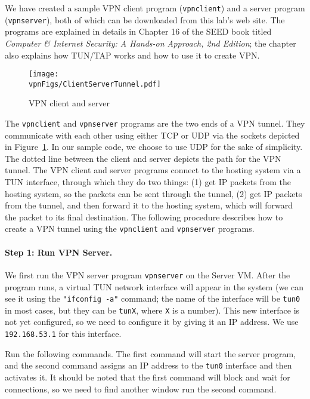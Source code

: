 We have created a sample VPN client program (\texttt{vpnclient})  and 
a server program (\texttt{vpnserver}), both of which can be downloaded from
this lab's web site. 
The programs are explained in details in Chapter 16 of the SEED book titled
\textit{Computer \& Internet Security: A Hands-on Approach, 2nd Edition}; the chapter also
explains how TUN/TAP works and how to use it to create VPN.



\begin{figure}[htb]
\begin{center}
\texttt{[image: \\vpnFigs/ClientServerTunnel.pdf]}
\end{center}
\caption{VPN client and server}
\label{vpn:fig:client_server}
\end{figure}

The \texttt{vpnclient} and \texttt{vpnserver} programs are the two ends of
a VPN tunnel. They communicate with each other using either TCP or UDP via the sockets
depicted in Figure~\ref{vpn:fig:client_server}. In our sample code, we choose 
to use UDP for the sake of simplicity.  The dotted line between the
client and server depicts the path for the VPN tunnel. 
The VPN client and server programs connect to the hosting system via a
TUN interface, through which they do two things: (1) get IP packets from
the hosting system, so the packets can be sent through the tunnel, (2) get IP packets from the
tunnel, and then forward it to the hosting system, which will forward the
packet to its final destination. 
The following procedure describes how to create a VPN tunnel 
using the \texttt{vpnclient} and \texttt{vpnserver} programs. 


\paragraph{Step 1: Run VPN Server.} 
We first run the VPN server program \texttt{vpnserver} on the Server VM.
After the program runs, a virtual TUN network interface will appear 
in the system (we can see it using the \texttt{"ifconfig -a"} command; the name of the
interface will be \texttt{tun0} in most cases, but they can be
\texttt{tunX}, where \texttt{X} is a number).   
This new interface is not yet configured, so we need to configure it by giving it an IP
address. We use \texttt{192.168.53.1} for this interface.  


Run the following commands. The first command will start the server
program, and the second command assigns an IP address to the \texttt{tun0}
interface and then activates it. It should be noted that the first 
command will block and wait for connections, 
so we need to find another window run the second command.



